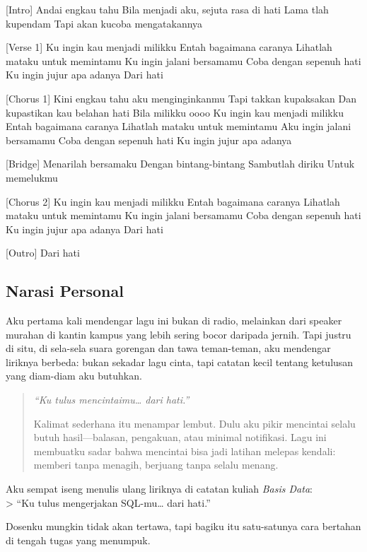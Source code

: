 \documentclass[
  letterpaper,
  DIV=11,
  numbers=noendperiod]{scrreprt}
\begin{document}
{[}Intro{]} Andai engkau tahu Bila menjadi aku, sejuta rasa di hati Lama
tlah kupendam Tapi akan kucoba mengatakannya

{[}Verse 1{]} Ku ingin kau menjadi milikku Entah bagaimana caranya
Lihatlah mataku untuk memintamu Ku ingin jalani bersamamu Coba dengan
sepenuh hati Ku ingin jujur apa adanya Dari hati

{[}Chorus 1{]} Kini engkau tahu aku menginginkanmu Tapi takkan
kupaksakan Dan kupastikan kau belahan hati Bila milikku oooo Ku ingin
kau menjadi milikku Entah bagaimana caranya Lihatlah mataku untuk
memintamu Aku ingin jalani bersamamu Coba dengan sepenuh hati Ku ingin
jujur apa adanya

{[}Bridge{]} Menarilah bersamaku Dengan bintang-bintang Sambutlah diriku
Untuk memelukmu

{[}Chorus 2{]} Ku ingin kau menjadi milikku Entah bagaimana caranya
Lihatlah mataku untuk memintamu Ku ingin jalani bersamamu Coba dengan
sepenuh hati Ku ingin jujur apa adanya Dari hati

{[}Outro{]} Dari hati

\subsection{Narasi Personal}\label{narasi-personal}

Aku pertama kali mendengar lagu ini bukan di radio, melainkan dari
speaker murahan di kantin kampus yang lebih sering bocor daripada
jernih. Tapi justru di situ, di sela-sela suara gorengan dan tawa
teman-teman, aku mendengar liriknya berbeda: bukan sekadar lagu cinta,
tapi catatan kecil tentang ketulusan yang diam-diam aku butuhkan.

\begin{quote}
\emph{``Ku tulus mencintaimu\ldots{} dari hati.''}

Kalimat sederhana itu menampar lembut. Dulu aku pikir mencintai selalu
butuh hasil---balasan, pengakuan, atau minimal notifikasi. Lagu ini
membuatku sadar bahwa mencintai bisa jadi latihan melepas kendali:
memberi tanpa menagih, berjuang tanpa selalu menang.
\end{quote}

Aku sempat iseng menulis ulang liriknya di catatan kuliah \emph{Basis
Data}:\\
\textgreater{} ``Ku tulus mengerjakan SQL-mu\ldots{} dari hati.''

Dosenku mungkin tidak akan tertawa, tapi bagiku itu satu-satunya cara
bertahan di tengah tugas yang menumpuk.
\end{document}
